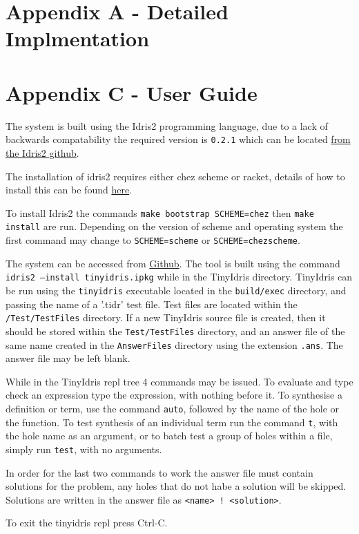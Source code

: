 \documentclass[a4paper]{article}
\begin{document}
\label{sec:org30d868f}
\section{Appendix A - Detailed Implmentation}
\label{sec:org4318281}

\section{Appendix C - User Guide}

The system is built using the Idris2 programming language, due to
a lack of backwards compatability the required version is
\texttt{0.2.1} which can be located
\href{https://github.com/idris-lang/Idris2/tree/compat-0.2.1}{from the Idris2 github}.

The installation of idris2 requires either chez scheme or racket,
details of how to install this can be found
\href{https://www.scheme.com/}{here}.

To install Idris2 the commands \texttt{make bootstrap SCHEME=chez}
then \texttt{make install} are run. Depending on the version of
scheme and operating system the first command may change to
\texttt{SCHEME=scheme} or \texttt{SCHEME=chezscheme}. 


The system can be accessed from \href{https://github.com/Ablach/tiny-idris-program-synthesis}{Github}. The tool is built using the command
\texttt{idris2 --install tinyidris.ipkg} while in the TinyIdris
directory. TinyIdris can be run using the \texttt{tinyidris}
executable located in the \texttt{build/exec} directory, and passing
the name of a '.tidr' test file. Test files are located within the \texttt{/Test/TestFiles} directory. If a new TinyIdris source file is created, then it
should be stored within the \texttt{Test/TestFiles}
directory, and an answer file of the same name created in the
\texttt{AnswerFiles} directory using the extension \texttt{.ans}.
The answer file may be left blank. 

While in the TinyIdris repl tree 4 commands may be issued. To evaluate
and type check an expression type the expression, with nothing before
it. To synthesise a definition or term, use the command \texttt{auto},
followed by the name of the hole or the function.
To test synthesis of an individual term run the command \texttt{t},
with the hole name as an argument, or to batch test a group of holes
within a file, simply run \texttt{test}, with no arguments.

In order for the last two commands to work the answer file must contain
solutions for the problem, any holes that do not habe a solution will
be skipped. Solutions are written in the answer file as
\texttt{<name> ! <solution>}.

To exit the tinyidris repl press Ctrl-C.
\end{document}
